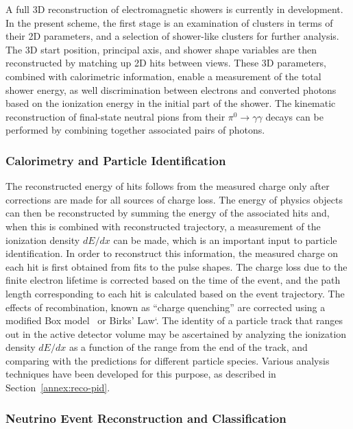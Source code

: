 A full 3D reconstruction of electromagnetic showers is currently in development.
In the present scheme, the first stage is an examination of clusters 
in terms of their 2D parameters, and a selection of shower-like clusters 
for further analysis. The 3D start position, principal axis,
and shower shape variables are then reconstructed by matching up 2D hits between views.
These 3D parameters, combined with calorimetric information, enable a measurement
of the total shower energy, as well discrimination between electrons
and converted photons based on the ionization energy in the initial part of
the shower. The kinematic reconstruction of final-state neutral pions from their
$\pi^{0} \rightarrow \gamma\gamma$ decays can be performed by 
combining together associated pairs of photons.


\subsubsection{Calorimetry and Particle Identification}

The reconstructed energy of hits follows from the measured charge 
only after corrections are made for all sources of charge loss. 
The energy of physics objects can then be reconstructed by summing 
the energy of the associated hits and, when this is combined with 
reconstructed trajectory, a measurement of the
ionization density $dE/dx$ can be made, which is an important input 
to particle identification.
In order to reconstruct this information, the measured charge on each hit 
is first obtained from fits to the pulse shapes.
The charge loss due to the finite electron lifetime is corrected
based on the time of the event, and the path length corresponding
to each hit is calculated based on the event trajectory.
The effects of recombination, known as ``charge quenching''
are corrected using a modified Box model~\cite{Thomas:1987zz} 
or Birks' Law`\cite{Birks:1964zz}.
The identity of a particle track that ranges out in the active detector volume
may be ascertained by analyzing the ionization density $dE/dx$ as a function of 
the range from the end of the track, and comparing with the predictions
for different particle species. Various analysis techniques have been developed
for this purpose, as described in Section~\ref{annex:reco-pid}.
 

\subsubsection{Neutrino Event Reconstruction and Classification}

